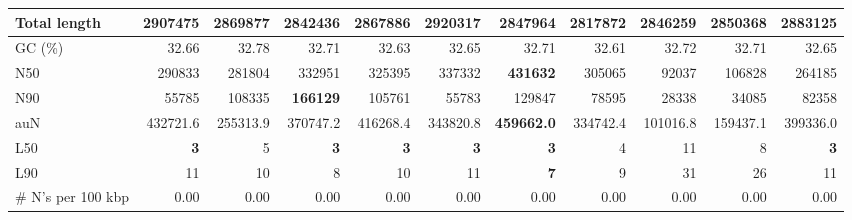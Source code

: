 \documentclass[12pt,a4paper]{article}
\begin{document}
\begin{table}[ht]
\begin{center}
\begin{tabular}{|l*{10}{|r}|}
Total length & 2907475 & 2869877 & 2842436 & 2867886 & {\bf 2920317} & 2847964 & 2817872 & 2846259 & 2850368 & 2883125 \\ \hline
GC (\%) & 32.66 & 32.78 & 32.71 & 32.63 & 32.65 & 32.71 & 32.61 & 32.72 & 32.71 & 32.65 \\ \hline
N50 & 290833 & 281804 & 332951 & 325395 & 337332 & {\bf 431632} & 305065 & 92037 & 106828 & 264185 \\ \hline
N90 & 55785 & 108335 & {\bf 166129} & 105761 & 55783 & 129847 & 78595 & 28338 & 34085 & 82358 \\ \hline
auN & 432721.6 & 255313.9 & 370747.2 & 416268.4 & 343820.8 & {\bf 459662.0} & 334742.4 & 101016.8 & 159437.1 & 399336.0 \\ \hline
L50 & {\bf 3} & 5 & {\bf 3} & {\bf 3} & {\bf 3} & {\bf 3} & 4 & 11 & 8 & {\bf 3} \\ \hline
L90 & 11 & 10 & 8 & 10 & 11 & {\bf 7} & 9 & 31 & 26 & 11 \\ \hline
\# N's per 100 kbp & 0.00 & 0.00 & 0.00 & 0.00 & 0.00 & 0.00 & 0.00 & 0.00 & 0.00 & 0.00 \\ \hline
\end{tabular}
\end{center}
\end{table}
\end{document}
